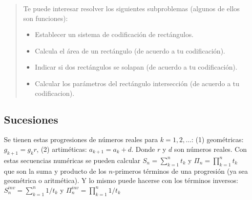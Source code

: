 \begin{quote}
Te puede interesar resolver los siguientes subproblemas (algunos de ellos son funciones):
\begin{itemize}
\item Establecer un sistema de codificación de rectángulos.
\item Calcula el área de un rectángulo (de acuerdo a tu codificación).
\item Indicar si dos rectángulos se solapan (de acuerdo a tu codificación).
\item Calcular los parámetros del rectángulo intersección (de acuerdo a tu codificacion).
\end{itemize}
\end{quote}






\separacion
\subsection{Sucesiones}

Se tienen estas  progresiones de números reales para $k=1,2,\ldots$: (1) geométricas: $g_{k+1}=g_{k}r$, (2) artiméticas: $a_{k+1}=a_{k}+d$. Donde $r$ y $d$ son números reales. Con estas secuencias numéricas se pueden calcular $S_n=\displaystyle\sum_{k=1}^n t_k$ y $\Pi_n= \displaystyle\prod_{k=1}^n t_k$ que son la suma y producto de los $n$-primeros términos de una progresión (ya sea geométrica o aritmética). Y lo mismo puede hacerse con los términos inversos: 
$\displaystyle S_n^{inv}= \displaystyle\sum_{k=1}^n 1/t_k$ y $\displaystyle\Pi_n^{inv}= \displaystyle\prod_{k=1}^n 1/t_k$ 


